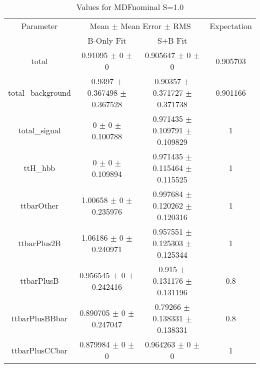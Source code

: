 \begin{table}
\centering
\caption{Values for MDFnominal S=1.0}
\begin{tabular}{cccc}
\toprule
Parameter & \multicolumn{2}{c}{Mean $\pm$ Mean Error $\pm$ RMS} & Expectation\\
 & B-Only Fit & S+B Fit & \\
\midrule
total & \num{0.91095} $\pm$ \num{0} $\pm$ \num{0} & \num{0.905647} $\pm$ \num{0} $\pm$ \num{0} & \num{0.905703}\\
total\_background & \num{0.9397} $\pm$ \num{0.367498} $\pm$ \num{0.367528} & \num{0.90357} $\pm$ \num{0.371727} $\pm$ \num{0.371738} & \num{0.901166}\\
total\_signal & \num{0} $\pm$ \num{0} $\pm$ \num{0.100788} & \num{0.971435} $\pm$ \num{0.109791} $\pm$ \num{0.109829} & \num{1}\\
ttH\_hbb & \num{0} $\pm$ \num{0} $\pm$ \num{0.109894} & \num{0.971435} $\pm$ \num{0.115464} $\pm$ \num{0.115525} & \num{1}\\
ttbarOther & \num{1.00658} $\pm$ \num{0} $\pm$ \num{0.235976} & \num{0.997684} $\pm$ \num{0.120262} $\pm$ \num{0.120316} & \num{1}\\
ttbarPlus2B & \num{1.06186} $\pm$ \num{0} $\pm$ \num{0.240971} & \num{0.957551} $\pm$ \num{0.125303} $\pm$ \num{0.125344} & \num{1}\\
ttbarPlusB & \num{0.956545} $\pm$ \num{0} $\pm$ \num{0.242416} & \num{0.915} $\pm$ \num{0.131176} $\pm$ \num{0.131196} & \num{0.8}\\
ttbarPlusBBbar & \num{0.890705} $\pm$ \num{0} $\pm$ \num{0.247047} & \num{0.79266} $\pm$ \num{0.138331} $\pm$ \num{0.138331} & \num{0.8}\\
ttbarPlusCCbar & \num{0.879984} $\pm$ \num{0} $\pm$ \num{0} & \num{0.964263} $\pm$ \num{0} $\pm$ \num{0} & \num{1}\\
\bottomrule
\end{tabular}
\end{table}